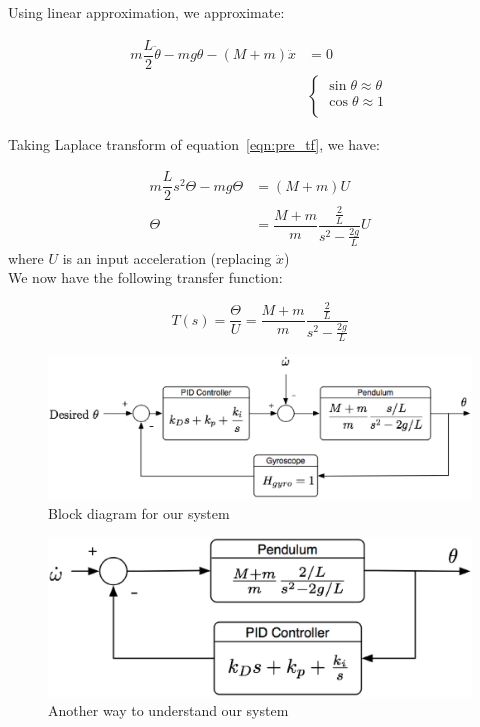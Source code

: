 \documentclass{notes}
\begin{document}
Using linear approximation, we approximate:

\begin{align}
  m\dfrac{L}{2}\ddot{\theta} - mg\theta - (M+m)\ddot{x} & = 0 \label{eqn:pre_tf} \\ 
  & \begin{cases}
    \sin\theta \approx \theta \nonumber\\
    \cos\theta \approx 1\nonumber\\
  \end{cases}
\end{align}
 
\noindent Taking Laplace transform of equation~\ref{eqn:pre_tf}, we have: 

\begin{align*}
  m\dfrac{L}{2}s^2\Theta - mg\Theta & = (M+m)U \\
  \Theta & = \dfrac{M+m}{m}\dfrac{\frac{2}{L}}{s^2 - \frac{2g}{L}}U
\end{align*}
where $U$ is an input acceleration (replacing $\ddot{x}$)\\

\noindent We now have the following transfer function:

\[
  T(s) = \dfrac{\Theta}{U} = \dfrac{M+m}{m}\dfrac{\frac{2}{L}}{s^2-\frac{2g}{L}}
\]

\begin{figure}[!h]
  \begin{center}
    \includegraphics[width=5 in]{pics/Block_Diagram_2.eps}
  \end{center}
  \caption{Block diagram for our system}
  \label{fig:block_diagram}
\end{figure}

\begin{figure}[!h]
  \begin{center}
    \includegraphics[width=4 in]{pics/Block_Diagram_3.eps}
  \end{center}
  \caption{Another way to understand  our system}
  \label{fig:block_diagram_3}
\end{figure}
\end{document}
